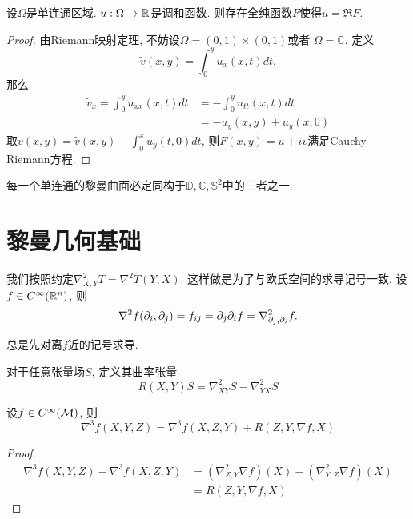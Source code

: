 \begin{proposition}
    设$\Omega$是单连通区域. $u: \Omega \to \mathbb{R}$是调和函数. 则存在全纯函数$F$使得$u=\Re F$.
\end{proposition}
\begin{proof}
    由Riemann映射定理, 不妨设$\Omega = (0,1)\times (0,1)$或者 $\Omega= \mathbb{C}$.  定义
    \begin{equation}
        \tilde{v}(x,y)= \int^y_0 u_x(x,t)dt. 
    \end{equation}
    那么
    \begin{equation}
        \begin{split}
            \tilde{v}_x  =\int^y_0 u_{xx}(x,t)dt &=- \int^y_0 u_{tt}(x,t)dt \\
            &= -u_y(x,y)+u_y(x,0)
        \end{split}
    \end{equation}
    取$v(x,y)=\tilde{v}(x,y)- \int^x_0 u_y(t,0)dt$, 则$F(x,y)=u+iv$满足Cauchy-Riemann方程.
\end{proof}
\begin{theorem}[单值化定理]
    每一个单连通的黎曼曲面必定同构于$\mathbb{D}, \mathbb{C}, \mathbb{S}^2$中的三者之一.
\end{theorem}
\section{黎曼几何基础}
我们按照约定$\nabla^2_{X,Y}T=\nabla^2T(Y,X)$. 这样做是为了与欧氏空间的求导记号一致. 设$f\in C^\infty(\mathbb{R}^n)$, 则
\begin{equation}
    \nabla^2f({\partial_i},{\partial_j})=f_{ij}= {\partial_j} {\partial_i} f = \nabla^2_{{\partial_j},{\partial_i}}f.
\end{equation}
\begin{remark}
    总是先对离$f$近的记号求导.
\end{remark}
\begin{definition}
    对于任意张量场$S$, 定义其曲率张量
    \begin{equation}
        R(X,Y)S=\nabla^2_{XY}S-\nabla^2_{YX}S
    \end{equation}
\end{definition}
\begin{proposition}
    设$f \in C^\infty({\mathcal{M}})$, 则
    \begin{equation}
        \nabla^3f(X,Y,Z)=\nabla^3f(X,Z,Y)+R(Z,Y,\nabla f, X)
    \end{equation}
\end{proposition}
\begin{proof}
    \begin{equation}
        \begin{split}
            \nabla^3f(X,Y,Z)-\nabla^3f(X,Z,Y) &=(\nabla^2_{Z,Y}\nabla f)(X)-(\nabla^2_{Y,Z}\nabla f)(X) \\
            &= R(Z,Y,\nabla f, X)
        \end{split}
    \end{equation}
\end{proof}